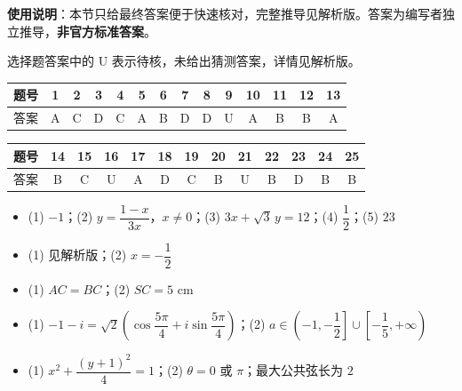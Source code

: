
\begin{gknotice}
\textbf{使用说明}：本节只给最终答案便于快速核对，完整推导见解析版。答案为编写者独立推导，\textbf{非官方标准答案}。
\end{gknotice}

\begin{gknotice}
选择题答案中的 U 表示待核，未给出猜测答案，详情见解析版。
\end{gknotice}

\begin{center}\begin{tabular}{cccccccccccccc}
\toprule
题号 & 1 & 2 & 3 & 4 & 5 & 6 & 7 & 8 & 9 & 10 & 11 & 12 & 13 \\
\midrule
答案 & A & C & D & C & A & B & D & D & U & A & B & B & A \\
\bottomrule
\end{tabular}\end{center}\medskip
\begin{center}\begin{tabular}{ccccccccccccc}
\toprule
题号 & 14 & 15 & 16 & 17 & 18 & 19 & 20 & 21 & 22 & 23 & 24 & 25 \\
\midrule
答案 & B & C & U & A & D & C & B & U & B & D & B & B \\
\bottomrule
\end{tabular}\end{center}

\begin{itemize}[leftmargin=2.6em]
  \item[\textbf{一.}] (1) $-1$；(2) $y=\dfrac{1-x}{3x}$，$x\ne0$；(3) $3x+\sqrt3\,y=12$；(4) $\dfrac12$；(5) $23$
\end{itemize}

\begin{itemize}[leftmargin=2.6em]
  \item[\textbf{二.}] (1) 见解析版；(2) $x=-\dfrac12$
  \item[\textbf{三.}] (1) $AC=BC$；(2) $SC=5\text{ cm}$
  \item[\textbf{四.}] (1) $-1-i=\sqrt2\left(\cos\dfrac{5\pi}{4}+i\sin\dfrac{5\pi}{4}\right)$；(2) $a\in\left(-1,-\dfrac12\right]\cup\left[-\dfrac15,+\infty\right)$
  \item[\textbf{五.}] (1) $x^2+\dfrac{(y+1)^2}{4}=1$；(2) $\theta=0$ 或 $\pi$；最大公共弦长为 $2$
\end{itemize}

